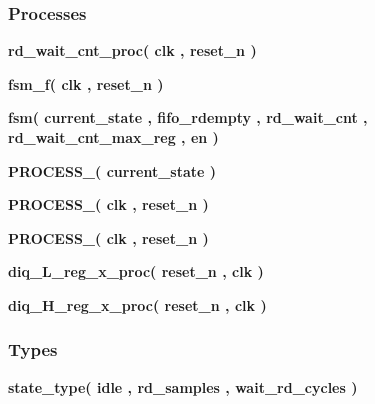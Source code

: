 \subsubsection*{Processes}
 \begin{DoxyCompactItemize}
\item 
{\bf rd\+\_\+wait\+\_\+cnt\+\_\+proc}{\bfseries  ( {\bfseries {\bfseries {\bf clk}} \textcolor{vhdlchar}{ }} , {\bfseries {\bfseries {\bf reset\+\_\+n}} \textcolor{vhdlchar}{ }} )}
\item 
{\bf fsm\+\_\+f}{\bfseries  ( {\bfseries {\bfseries {\bf clk}} \textcolor{vhdlchar}{ }} , {\bfseries {\bfseries {\bf reset\+\_\+n}} \textcolor{vhdlchar}{ }} )}
\item 
{\bf fsm}{\bfseries  ( {\bfseries {\bfseries {\bf current\+\_\+state}} \textcolor{vhdlchar}{ }} , {\bfseries {\bfseries {\bf fifo\+\_\+rdempty}} \textcolor{vhdlchar}{ }} , {\bfseries {\bfseries {\bf rd\+\_\+wait\+\_\+cnt}} \textcolor{vhdlchar}{ }} , {\bfseries {\bfseries {\bf rd\+\_\+wait\+\_\+cnt\+\_\+max\+\_\+reg}} \textcolor{vhdlchar}{ }} , {\bfseries {\bfseries {\bf en}} \textcolor{vhdlchar}{ }} )}
\item 
{\bf P\+R\+O\+C\+E\+S\+S\+\_}{\bfseries  ( {\bfseries {\bfseries {\bf current\+\_\+state}} \textcolor{vhdlchar}{ }} )}
\item 
{\bf P\+R\+O\+C\+E\+S\+S\+\_}{\bfseries  ( {\bfseries {\bfseries {\bf clk}} \textcolor{vhdlchar}{ }} , {\bfseries {\bfseries {\bf reset\+\_\+n}} \textcolor{vhdlchar}{ }} )}
\item 
{\bf P\+R\+O\+C\+E\+S\+S\+\_}{\bfseries  ( {\bfseries {\bfseries {\bf clk}} \textcolor{vhdlchar}{ }} , {\bfseries {\bfseries {\bf reset\+\_\+n}} \textcolor{vhdlchar}{ }} )}
\item 
{\bf diq\+\_\+\+L\+\_\+reg\+\_\+x\+\_\+proc}{\bfseries  ( {\bfseries {\bfseries {\bf reset\+\_\+n}} \textcolor{vhdlchar}{ }} , {\bfseries {\bfseries {\bf clk}} \textcolor{vhdlchar}{ }} )}
\item 
{\bf diq\+\_\+\+H\+\_\+reg\+\_\+x\+\_\+proc}{\bfseries  ( {\bfseries {\bfseries {\bf reset\+\_\+n}} \textcolor{vhdlchar}{ }} , {\bfseries {\bfseries {\bf clk}} \textcolor{vhdlchar}{ }} )}
\end{DoxyCompactItemize}
\subsubsection*{Types}
 \begin{DoxyCompactItemize}
\item 
{\bfseries {\bf state\+\_\+type}{\bfseries \textcolor{vhdlchar}{(}\textcolor{vhdlchar}{ }\textcolor{vhdlchar}{idle}\textcolor{vhdlchar}{ }\textcolor{vhdlchar}{,}\textcolor{vhdlchar}{ }\textcolor{vhdlchar}{rd\+\_\+samples}\textcolor{vhdlchar}{ }\textcolor{vhdlchar}{,}\textcolor{vhdlchar}{ }\textcolor{vhdlchar}{wait\+\_\+rd\+\_\+cycles}\textcolor{vhdlchar}{ }\textcolor{vhdlchar}{)}\textcolor{vhdlchar}{ }}} 
\end{DoxyCompactItemize}
